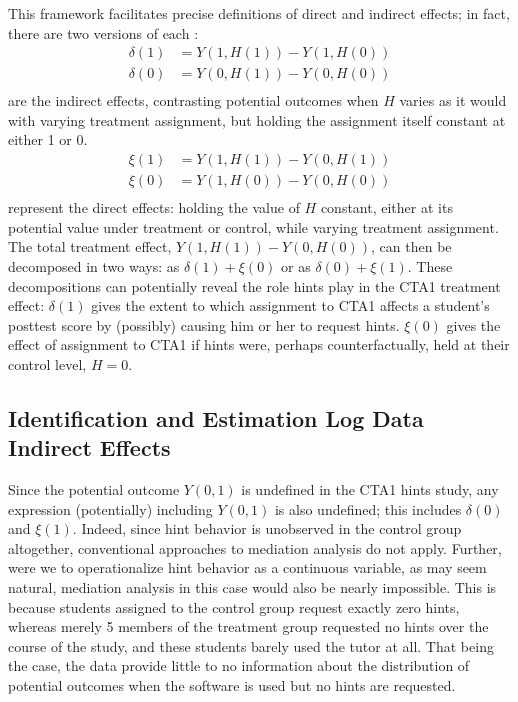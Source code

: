 \documentclass{article}\usepackage[]{graphicx}\usepackage[]{color}
\begin{document}
This framework facilitates precise definitions of direct and indirect
effects; in fact, there are two versions of each \cite[e.g.][]{imai2011unpacking}:
\begin{align*}
\delta(1)&=Y(1,H(1))-Y(1,H(0))\\
\delta(0)&=Y(0,H(1))-Y(0,H(0))\\
\end{align*}
are the indirect effects, contrasting potential outcomes when $H$
varies as it would with varying treatment assignment, but holding the
assignment itself constant at either 1 or 0.
\begin{align*}
\xi(1)&=Y(1,H(1))-Y(0,H(1))\\
\xi(0)&=Y(1,H(0))-Y(0,H(0))\\
\end{align*}
represent the direct effects: holding the value of $H$ constant,
either at its potential value under treatment or control, while
varying treatment assignment.
The total treatment effect, $Y(1,H(1))-Y(0,H(0))$, can then be
decomposed in two ways: as $\delta(1)+\xi(0)$ or as
$\delta(0)+\xi(1)$.
These decompositions can potentially reveal the role hints play in the
CTA1 treatment effect: $\delta(1)$ gives the extent to which
assignment to CTA1 affects a student's posttest score by (possibly)
causing him or her to request hints.
$\xi(0)$ gives the effect of assignment to CTA1 if hints were,
perhaps counterfactually, held at their control level, $H=0$.


\subsection{Identification and Estimation Log Data  Indirect
  Effects}\label{sec:indirectEst}

Since the potential outcome $Y(0,1)$ is undefined in the CTA1 hints
study, any expression (potentially) including $Y(0,1)$ is also
undefined; this includes $\delta(0)$ and $\xi(1)$.
Indeed, since hint behavior is unobserved in the control group
altogether, conventional approaches to mediation analysis do not
apply.
Further, were we to operationalize hint behavior as a continuous
variable, as may seem natural, mediation analysis in this case would
also be nearly impossible.
This is because students assigned to the control group request exactly
zero hints, whereas merely
5
members of the treatment group
requested no hints over the course of the study, and these students
barely used the tutor at all.
That being the case, the data provide little to no information about
the distribution of potential outcomes when the software is used
but no hints are requested.
\end{document}
